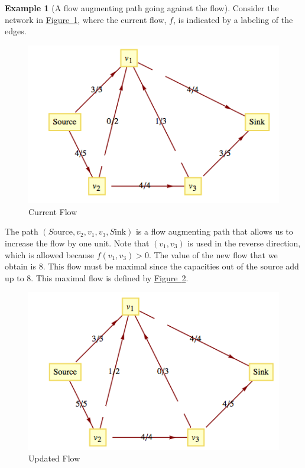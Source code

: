 \documentclass[10pt,]{book}
\theoremstyle{plain}
\theoremstyle{definition}
\theoremstyle{definition}
\theoremstyle{definition}
\newtheorem{example}[theorem]{Example}
\theoremstyle{definition}
\theoremstyle{definition}
\numberwithin{equation}{section}
\begin{document}
\begin{example}[A flow augmenting path going against the flow]\label{ex-fap-1}
 Consider the network in \hyperref[fig-flow-example-before]{Figure~\ref{fig-flow-example-before}}, where the current flow, \(f\), is indicated by a labeling of the edges. %
\leavevmode%
\begin{figure}
\centering
\includegraphics[width=1\linewidth]{images/fig-flow-example-before.png}
\caption{Current Flow
                \label{fig-flow-example-before}}
\end{figure}
\par
The path
\(\left(S\text{ource}, v_2 , v_1,v_3 , S\text{ink}\right)\) is a flow augmenting path that allows us to increase the flow by one
unit. Note that \(\left(v_1,v_3\right)\) is used in the reverse direction, which is allowed because \(f\left(v_1,v_3\right)>0\). The value of
the new flow that we obtain is 8. This flow must be maximal since the capacities out of the source add up to 8. This maximal flow is defined by \hyperref[fig-updated-flow]{Figure~\ref{fig-updated-flow}}.%
\leavevmode%
\begin{figure}
\centering
\includegraphics[width=1\linewidth]{images/fig-updated-flow.png}
\caption{Updated Flow
                \label{fig-updated-flow}}
\end{figure}
\end{example}
\typeout{************************************************}
\typeout{************************************************}
\end{document}
